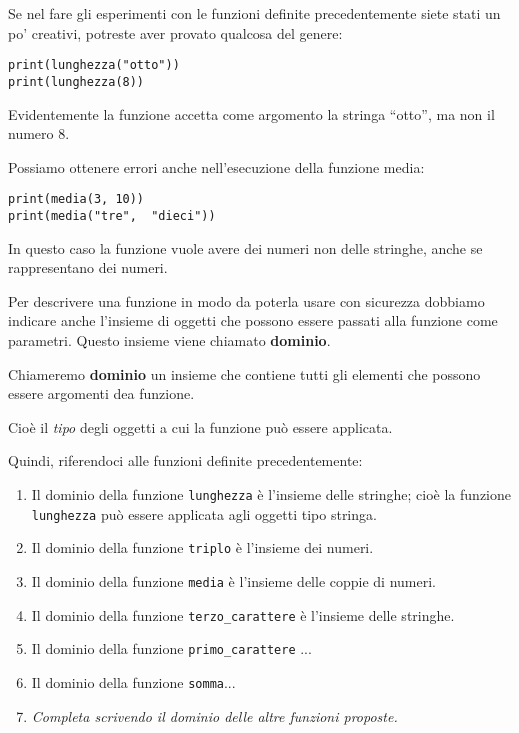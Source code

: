 Se nel fare gli esperimenti con le funzioni definite precedentemente siete 
stati un po' creativi, potreste aver provato qualcosa del genere:

\begin{lstlisting}
print(lunghezza("otto"))
print(lunghezza(8))
\end{lstlisting}

Evidentemente la funzione accetta come argomento la stringa  ``otto'', ma 
non il numero 8.

Possiamo ottenere errori anche nell'esecuzione della funzione media:

\begin{lstlisting}
print(media(3, 10))
print(media("tre",  "dieci"))
\end{lstlisting}

In questo caso la funzione vuole avere dei numeri non delle stringhe, anche 
se rappresentano dei numeri.

Per descrivere una funzione in modo da poterla usare con sicurezza 
dobbiamo indicare anche l'insieme di oggetti che possono essere passati 
alla funzione come parametri. Questo insieme viene chiamato 
\textbf{dominio}.

\begin{definizione}
Chiameremo \textbf{dominio} un insieme che contiene tutti gli elementi che 
possono essere argomenti dea funzione.
\end{definizione}

Cioè il \emph{tipo} degli oggetti a cui la funzione può essere applicata.

Quindi, riferendoci alle funzioni definite precedentemente:

\begin{enumerate} [noitemsep]
\item Il dominio della funzione \texttt{lunghezza} è l'insieme delle 
stringhe; cioè la funzione \texttt{lunghezza} può essere applicata agli 
oggetti tipo stringa.
\item Il dominio della funzione \texttt{triplo} è l'insieme dei numeri.
\item Il dominio della funzione \texttt{media} è l'insieme delle coppie di 
numeri.
\item Il dominio della funzione \texttt{terzo\_carattere} è l'insieme delle 
stringhe.
\item Il dominio della funzione \texttt{primo\_carattere} ...
\item Il dominio della funzione \texttt{somma}...
\item \emph{Completa scrivendo il dominio delle altre funzioni proposte.}
\end{enumerate}


